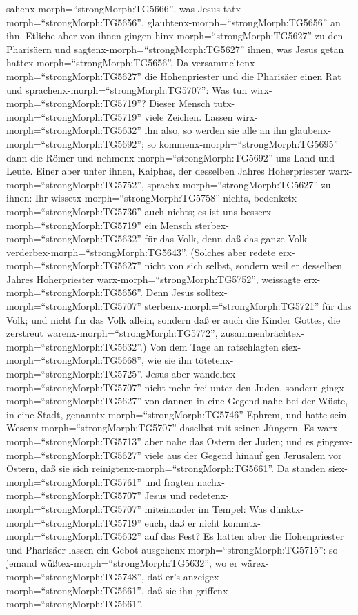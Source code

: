 sahenx-morph=``strongMorph:TG5666'', was Jesus
tatx-morph=``strongMorph:TG5656'',
glaubtenx-morph=``strongMorph:TG5656'' an ihn.  Etliche
aber von ihnen gingen hinx-morph=``strongMorph:TG5627'' zu den
Pharisäern und sagtenx-morph=``strongMorph:TG5627'' ihnen, was Jesus
getan hattex-morph=``strongMorph:TG5656''.  Da
versammeltenx-morph=``strongMorph:TG5627'' die Hohenpriester und die
Pharisäer einen Rat und sprachenx-morph=``strongMorph:TG5707'': Was tun
wirx-morph=``strongMorph:TG5719''? Dieser Mensch
tutx-morph=``strongMorph:TG5719'' viele Zeichen.  Lassen
wirx-morph=``strongMorph:TG5632'' ihn also, so werden sie alle an ihn
glaubenx-morph=``strongMorph:TG5692''; so
kommenx-morph=``strongMorph:TG5695'' dann die Römer und
nehmenx-morph=``strongMorph:TG5692'' uns Land und Leute. 
Einer aber unter ihnen, Kaiphas, der desselben Jahres Hoherpriester
warx-morph=``strongMorph:TG5752'', sprachx-morph=``strongMorph:TG5627''
zu ihnen: Ihr wissetx-morph=``strongMorph:TG5758'' nichts, 
bedenketx-morph=``strongMorph:TG5736'' auch nichts; es ist uns
besserx-morph=``strongMorph:TG5719'' ein Mensch
sterbex-morph=``strongMorph:TG5632'' für das Volk, denn daß das ganze
Volk verderbex-morph=``strongMorph:TG5643''.  (Solches aber
redete erx-morph=``strongMorph:TG5627'' nicht von sich selbst, sondern
weil er desselben Jahres Hoherpriester
warx-morph=``strongMorph:TG5752'', weissagte
erx-morph=``strongMorph:TG5656''. Denn Jesus
solltex-morph=``strongMorph:TG5707''
sterbenx-morph=``strongMorph:TG5721'' für das Volk;  und
nicht für das Volk allein, sondern daß er auch die Kinder Gottes, die
zerstreut warenx-morph=``strongMorph:TG5772'',
zusammenbrächtex-morph=``strongMorph:TG5632''.)  Von dem
Tage an ratschlagten siex-morph=``strongMorph:TG5668'', wie sie ihn
tötetenx-morph=``strongMorph:TG5725''.  Jesus aber
wandeltex-morph=``strongMorph:TG5707'' nicht mehr frei unter den Juden,
sondern gingx-morph=``strongMorph:TG5627'' von dannen in eine Gegend
nahe bei der Wüste, in eine Stadt, genanntx-morph=``strongMorph:TG5746''
Ephrem, und hatte sein Wesenx-morph=``strongMorph:TG5707'' daselbst mit
seinen Jüngern.  Es warx-morph=``strongMorph:TG5713'' aber
nahe das Ostern der Juden; und es gingenx-morph=``strongMorph:TG5627''
viele aus der Gegend hinauf gen Jerusalem vor Ostern, daß sie sich
reinigtenx-morph=``strongMorph:TG5661''.  Da standen
siex-morph=``strongMorph:TG5761'' und fragten
nachx-morph=``strongMorph:TG5707'' Jesus und
redetenx-morph=``strongMorph:TG5707'' miteinander im Tempel: Was
dünktx-morph=``strongMorph:TG5719'' euch, daß er nicht
kommtx-morph=``strongMorph:TG5632'' auf das Fest?  Es
hatten aber die Hohenpriester und Pharisäer lassen ein Gebot
ausgehenx-morph=``strongMorph:TG5715'': so jemand
wüßtex-morph=``strongMorph:TG5632'', wo er
wärex-morph=``strongMorph:TG5748'', daß er's
anzeigex-morph=``strongMorph:TG5661'', daß sie ihn
griffenx-morph=``strongMorph:TG5661''.

